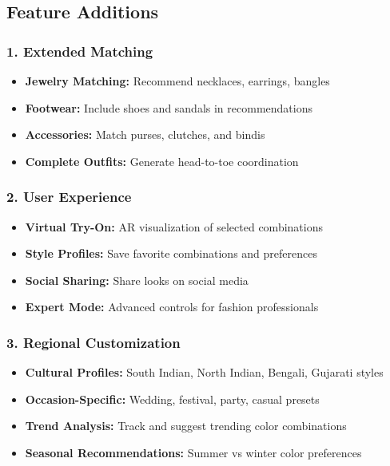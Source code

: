 \documentclass[12pt,a4paper]{report}
\begin{document}
\subsection{Feature Additions}

\subsubsection{1. Extended Matching}
\begin{itemize}
    \item \textbf{Jewelry Matching:} Recommend necklaces, earrings, bangles
    \item \textbf{Footwear:} Include shoes and sandals in recommendations
    \item \textbf{Accessories:} Match purses, clutches, and bindis
    \item \textbf{Complete Outfits:} Generate head-to-toe coordination
\end{itemize}

\subsubsection{2. User Experience}
\begin{itemize}
    \item \textbf{Virtual Try-On:} AR visualization of selected combinations
    \item \textbf{Style Profiles:} Save favorite combinations and preferences
    \item \textbf{Social Sharing:} Share looks on social media
    \item \textbf{Expert Mode:} Advanced controls for fashion professionals
\end{itemize}

\subsubsection{3. Regional Customization}
\begin{itemize}
    \item \textbf{Cultural Profiles:} South Indian, North Indian, Bengali, Gujarati styles
    \item \textbf{Occasion-Specific:} Wedding, festival, party, casual presets
    \item \textbf{Trend Analysis:} Track and suggest trending color combinations
    \item \textbf{Seasonal Recommendations:} Summer vs winter color preferences
\end{itemize}
\end{document}
